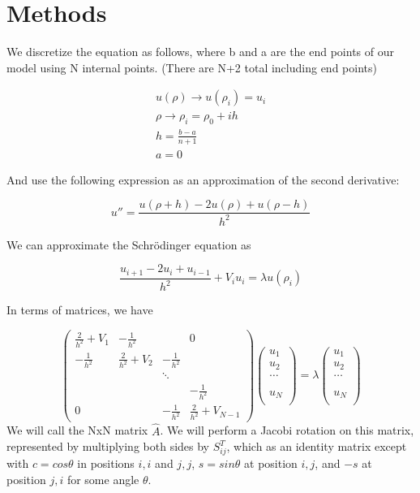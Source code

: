 \documentclass{article}
\begin{document}
\section{Methods}

We discretize the equation as follows, where b and a are the end points of our model using N internal points. (There are N+2 total including end points)

\begin{equation}
\begin{aligned}
u(\rho) \to u(\rho_i) = u_i \\
\rho \to \rho_i = \rho_0 + i h \\
h = \frac{b-a}{n+1} \\
a = 0
\end{aligned}
\end{equation}

And use the following expression as an approximation of the second derivative:

$$u''=\frac{u(\rho+h)-2u(\rho)+u(\rho-h)}{h^2}$$

We can approximate the Schr\"odinger equation as 

$$\frac{u_{i+1}-2u_i+u_{i-1}}{h^2}+V_iu_i=\lambda u(\rho_i)$$

In terms of matrices, we have

\begin{equation}
\left( \begin{array}{cccc}
\frac{2}{h^2} + V_1 &    -\frac{1}{h^2}   &                &   0 \\
-\frac{1}{h^2}       & \frac{2}{h^2} + V_2 & -\frac{1}{h^2} &   \\
&                     &     \ddots     &                        \\
&                     &                &    -\frac{1}{h^2}      \\
0&                     & -\frac{1}{h^2} & \frac{2}{h^2} + V_{N-1}
\end{array} \right)
\left( \begin{array}{cccc}
u_1\\
u_2\\
\dots\\
\\
\\
u_{N}\\
\end{array} \right)
=\lambda
\left( \begin{array}{cccc}
u_1\\
u_2\\
\dots\\
\\
\\
u_{N}\\
\end{array} \right)
\end{equation}
We will call the NxN matrix $\hat{A}$. We will perform a Jacobi rotation on this matrix, represented by multiplying both sides by $S_{ij}^T$, which as an identity matrix except with $c=cos\theta$ in positions $i,i$ and $j,j$, $s=sin\theta$ at position $i,j$, and $-s$ at position $j,i$ for some angle $\theta$.
\end{document}

